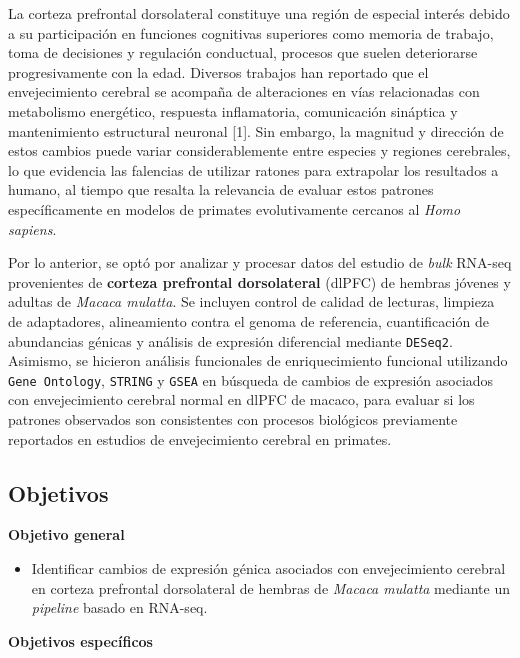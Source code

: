 \documentclass[
  12pt,
  letterpaper,
  DIV=11,
  numbers=noendperiod]{scrartcl}
\providecommand{\tightlist}{%
  \setlength{\itemsep}{0pt}\setlength{\parskip}{0pt}}
\begin{document}
La corteza prefrontal dorsolateral constituye una región de especial
interés debido a su participación en funciones cognitivas superiores
como memoria de trabajo, toma de decisiones y regulación conductual,
procesos que suelen deteriorarse progresivamente con la edad. Diversos
trabajos han reportado que el envejecimiento cerebral se acompaña de
alteraciones en vías relacionadas con metabolismo energético, respuesta
inflamatoria, comunicación sináptica y mantenimiento estructural
neuronal {[}1{]}. Sin embargo, la magnitud y dirección de estos cambios
puede variar considerablemente entre especies y regiones cerebrales, lo
que evidencia las falencias de utilizar ratones para extrapolar los
resultados a humano, al tiempo que resalta la relevancia de evaluar
estos patrones específicamente en modelos de primates evolutivamente
cercanos al \emph{Homo sapiens}.

Por lo anterior, se optó por analizar y procesar datos del estudio de
\emph{bulk} RNA-seq provenientes de \textbf{corteza prefrontal
dorsolateral} (dlPFC) de hembras jóvenes y adultas de \emph{Macaca
mulatta}. Se incluyen control de calidad de lecturas, limpieza de
adaptadores, alineamiento contra el genoma de referencia, cuantificación
de abundancias génicas y análisis de expresión diferencial mediante
\texttt{DESeq2}. Asimismo, se hicieron análisis funcionales de
enriquecimiento funcional utilizando \texttt{Gene\ Ontology},
\texttt{STRING} y \texttt{GSEA} en búsqueda de cambios de expresión
asociados con envejecimiento cerebral normal en dlPFC de macaco, para
evaluar si los patrones observados son consistentes con procesos
biológicos previamente reportados en estudios de envejecimiento cerebral
en primates.

\subsection{Objetivos}\label{objetivos}

\textbf{Objetivo general}

\begin{itemize}
\tightlist
\item
  Identificar cambios de expresión génica asociados con envejecimiento
  cerebral en corteza prefrontal dorsolateral de hembras de \emph{Macaca
  mulatta} mediante un \emph{pipeline} basado en RNA-seq.
\end{itemize}

\textbf{Objetivos específicos}
\end{document}
